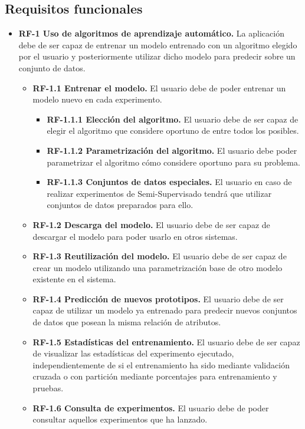 \subsection{Requisitos funcionales}\label{requisitos-funcionales}
\begin{itemize}
\tightlist
\item
  \textbf{RF-1 Uso de algoritmos de aprendizaje automático.} La aplicación debe de ser capaz de entrenar un modelo entrenado con un algoritmo elegido por el usuario y posteriormente utilizar dicho modelo para predecir sobre un conjunto de datos.

\begin{itemize}
\tightlist
\item \textbf{RF-1.1 Entrenar el modelo.} El usuario debe de poder entrenar un modelo nuevo en cada experimento.
    \begin{itemize}
    \tightlist
    \item \textbf{RF-1.1.1 Elección del algoritmo.} El usuario debe de ser capaz de elegir el algoritmo que considere oportuno de entre todos los posibles.
     \item \textbf{RF-1.1.2 Parametrización del algoritmo.} El usuario debe poder parametrizar el algoritmo cómo considere oportuno para su problema.
     \item \textbf{RF-1.1.3 Conjuntos de datos especiales.} El usuario en caso de realizar experimentos de Semi-Supervisado tendrá que utilizar conjuntos de datos preparados para ello.
    \end{itemize}
    \item \textbf{RF-1.2 Descarga del modelo.} El usuario debe de ser capaz de descargar el modelo para poder usarlo en otros sistemas.
    \item \textbf{RF-1.3 Reutilización del modelo.} El usuario debe de ser capaz de crear un modelo  utilizando una parametrización base de otro modelo existente en el sistema.
    \item \textbf{RF-1.4 Predicción de nuevos prototipos.} El usuario debe de ser capaz de utilizar un modelo ya entrenado para predecir nuevos conjuntos de datos que posean la misma relación de atributos.
    \item \textbf{RF-1.5 Estadísticas del entrenamiento.} El usuario debe de ser capaz de visualizar las estadísticas del experimento ejecutado, independientemente de si el entrenamiento ha sido mediante validación cruzada o con partición mediante porcentajes para entrenamiento y pruebas.
	\item \textbf{RF-1.6 Consulta de experimentos.} El usuario debe de poder consultar aquellos experimentos que ha lanzado.

\end{itemize}
\end{itemize}

